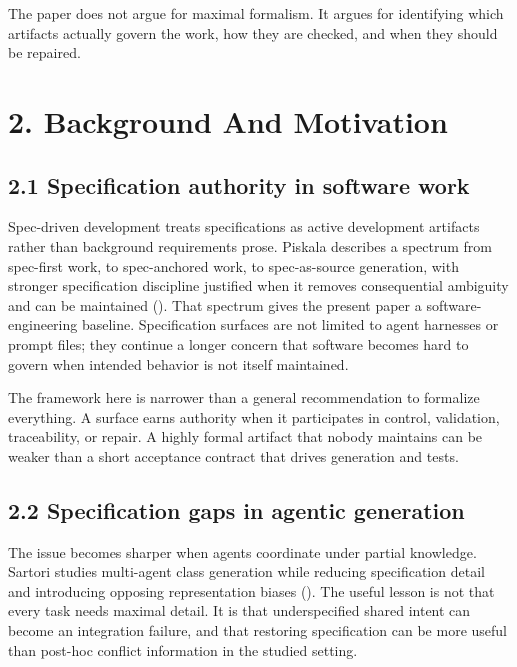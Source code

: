 \documentclass[
]{article}
\begin{document}
The paper does not argue for maximal formalism. It argues for
identifying which artifacts actually govern the work, how they are
checked, and when they should be repaired.

\section{2. Background And Motivation}\label{background-and-motivation}

\subsection{2.1 Specification authority in software
work}\label{specification-authority-in-software-work}

Spec-driven development treats specifications as active development
artifacts rather than background requirements prose. Piskala describes a
spectrum from spec-first work, to spec-anchored work, to spec-as-source
generation, with stronger specification discipline justified when it
removes consequential ambiguity and can be maintained
(). That spectrum
gives the present paper a software-engineering baseline. Specification
surfaces are not limited to agent harnesses or prompt files; they
continue a longer concern that software becomes hard to govern when
intended behavior is not itself maintained.

The framework here is narrower than a general recommendation to
formalize everything. A surface earns authority when it participates in
control, validation, traceability, or repair. A highly formal artifact
that nobody maintains can be weaker than a short acceptance contract
that drives generation and tests.

\subsection{2.2 Specification gaps in agentic
generation}\label{specification-gaps-in-agentic-generation}

The issue becomes sharper when agents coordinate under partial
knowledge. Sartori studies multi-agent class generation while reducing
specification detail and introducing opposing representation biases
(). The useful lesson is
not that every task needs maximal detail. It is that underspecified
shared intent can become an integration failure, and that restoring
specification can be more useful than post-hoc conflict information in
the studied setting.
\end{document}
